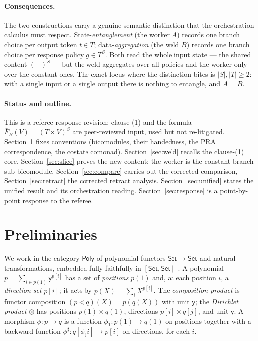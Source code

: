 \documentclass[11pt]{article}
\newcommand{\comp}{\mathbin{\triangleleft}}       %
\newcommand{\Set}{\mathsf{Set}}
\newcommand{\Poly}{\mathsf{Poly}}
\newcommand{\y}{\mathsf{y}}
\newcommand{\bk}[1]{{#1}^{\sharp}}                 %
\theoremstyle{plain}
\theoremstyle{definition}
\theoremstyle{remark}
\begin{document}
\paragraph{Consequences.}
The two constructions carry a genuine semantic distinction that the orchestration calculus
must respect. State-\emph{entanglement} (the worker $A$) records one branch choice per
output token $t\in T$; data-\emph{aggregation} (the weld $B$) records one branch choice
per response policy $g\in T^S$. Both read the whole input state --- the shared content
$(-)^S$ --- but the weld aggregates over all policies and the worker only over the constant
ones. The exact locus where the distinction bites is $|S|,|T|\ge2$: with a single input or
a single output there is nothing to entangle, and $A=B$.

\paragraph{Status and outline.}
This is a referee-response revision: clause (1) and the formula $\bar F_B(V)=(T\times V)^S$
are peer-reviewed input, used but not re-litigated. Section~\ref{sec:prelim} fixes
conventions (bicomodules, their handedness, the PRA correspondence, the costate comonad).
Section~\ref{sec:weld} recalls the clause-(1) core. Section~\ref{sec:slice} proves the new
content: the worker is the constant-branch sub-bicomodule. Section~\ref{sec:compare}
carries out the corrected comparison, Section~\ref{sec:retract} the corrected retract
analysis. Section~\ref{sec:unified} states the unified result and its orchestration
reading. Section~\ref{sec:response} is a point-by-point response to the referee.

\section{Preliminaries}\label{sec:prelim}

We work in the category $\Poly$ of polynomial functors $\Set\to\Set$ and natural
transformations, embedded fully faithfully in $[\Set,\Set]$~\cite{SGF,NiuSpivak}. A
polynomial $p=\sum_{i\in p(1)}\y^{p[i]}$ has a set of \emph{positions} $p(1)$ and, at each
position $i$, a \emph{direction set} $p[i]$; it acts by $p(X)=\sum_i X^{p[i]}$. The
\emph{composition product} is functor composition $(p\comp q)(X)=p(q(X))$ with unit $\y$;
the \emph{Dirichlet product} $\otimes$ has positions $p(1)\times q(1)$, directions
$p[i]\times q[j]$, and unit $\y$. A morphism $\phi\colon p\to q$ is a function
$\phi_1\colon p(1)\to q(1)$ on positions together with a backward function
$\bk\phi\colon q[\phi_1 i]\to p[i]$ on directions, for each $i$.
\end{document}
